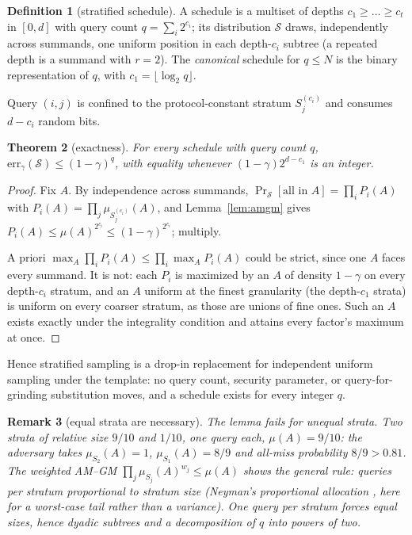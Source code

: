 \documentclass[11pt]{article}
\newcommand{\N}{N}
\newcommand{\err}{\mathrm{err}}
\newcommand{\Strat}{\mathcal{S}}
\newtheorem{theorem}{Theorem}
\newtheorem{remark}[theorem]{Remark}
\theoremstyle{definition}
\newtheorem{definition}[theorem]{Definition}
\begin{document}
\begin{definition}[stratified schedule]
A schedule is a multiset of depths $c_1 \ge \dots \ge c_t$ in $[0,d]$
with query count $q = \sum_i 2^{c_i}$; its distribution $\Strat$ draws,
independently across summands, one uniform position in each depth-$c_i$
subtree (a repeated depth is a summand with $r = 2$). The
\emph{canonical} schedule for $q \le \N$ is the binary representation of
$q$, with $c_1 = \lfloor \log_2 q \rfloor$.
\end{definition}

Query $(i,j)$ is confined to the protocol-constant stratum
$S^{(c_i)}_j$ and consumes $d - c_i$ random bits.

\begin{theorem}[exactness]\label{thm:main}
For every schedule with query count $q$,
$\err_\gamma(\Strat) \le (1-\gamma)^q$, with equality whenever
$(1-\gamma)2^{d-c_1}$ is an integer.
\end{theorem}

\begin{proof}
Fix $A$. By independence across summands,
$\Pr_{\Strat}[\text{all in } A] = \prod_i P_i(A)$ with
$P_i(A) = \prod_j \mu_{S^{(c_i)}_j}(A)$, and Lemma~\ref{lem:amgm} gives
$P_i(A) \le \mu(A)^{2^{c_i}} \le (1-\gamma)^{2^{c_i}}$; multiply.

A priori $\max_A \prod_i P_i(A) \le \prod_i \max_A P_i(A)$ could be
strict, since one $A$ faces every summand. It is not: each $P_i$ is
maximized by an $A$ of density $1-\gamma$ on every depth-$c_i$ stratum,
and an $A$ uniform at the finest granularity (the depth-$c_1$ strata) is
uniform on every coarser stratum, as those are unions of fine ones. Such
an $A$ exists exactly under the integrality condition and attains every
factor's maximum at once.
\end{proof}

Hence stratified sampling is a drop-in replacement for independent
uniform sampling under the template: no query count, security parameter,
or query-for-grinding substitution moves, and a schedule exists for
every integer $q$.

\begin{remark}[equal strata are necessary]
The lemma fails for unequal strata. Two strata of relative size $9/10$
and $1/10$, one query each, $\mu(A) = 9/10$: the adversary takes
$\mu_{S_2}(A) = 1$, $\mu_{S_1}(A) = 8/9$ and all-miss probability
$8/9 > 0.81$. The weighted AM--GM
$\prod_j \mu_{S_j}(A)^{w_j} \le \mu(A)$ shows the general rule: queries
per stratum proportional to stratum size (Neyman's proportional
allocation \cite{neyman}, here for a worst-case tail rather than a
variance). One query per stratum forces equal sizes, hence dyadic
subtrees and a decomposition of $q$ into powers of two.
\end{remark}
\end{document}
